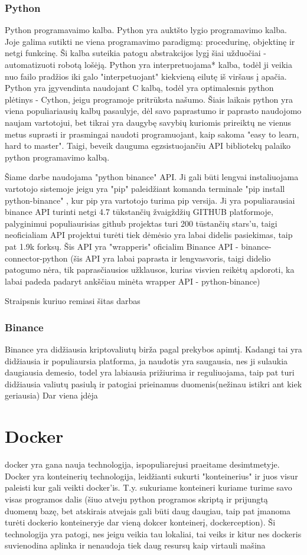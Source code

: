 \documentclass{VUMIFInfKursinis}
\begin{document}
\subsubsection{Python}
Python programavaimo kalba. Python yra auktšto lygio programavimo kalba. Joje galima sutikti ne viena programavimo paradigmą:
procedurinę, objektinę ir netgi funkcinę. Ši kalba suteikia patogu abstrakcijos lygį šiai užduočiai - automatizuoti robotą lošėją.
Python yra interpretuojama* kalba, todėl ji veikia nuo failo pradžios iki galo "interpetuojant" kiekvieną eilutę iš viršaus į apačia.
Python yra įgyvendinta naudojant C kalbą, todėl yra optimalesnis python plėtinys - Cython, jeigu programoje pritrūksta našumo. Šiais laikais
python yra viena populiariausių kalbų pasaulyje, dėl savo paprastumo ir paprasto naudojomo naujam vartotojui, bet tikrai yra daugybę savybių
kuriomis prireiktų ne vienus metus suprasti ir prasmingai naudoti programuojant, kaip sakoma "easy to learn, hard to master". Taigi, beveik dauguma
egzsistuojančiu API bibliotekų palaiko python programavimo kalbą.

Šiame darbe naudojama "python binance" API. Ji gali būti lengvai instaliuojama vartotojo sistemoje jeigu yra "pip" paleidžiant komanda terminale "pip install python-binance"
, kur pip yra vartotojo turima pip versija. Ji yra populiarausiai binance API turinti netgi 4.7 tūkstančių žvaigždžių GITHUB platformoje\cite{DokTest}, palyginimui populiaurisias github projektas turi
200 tūstančių stars'u, taigi neoficialiam API projektui turėti tiek dėmėsio yra labai didelis pasiekimas, taip pat 1.9k forksų. Šis API yra "wrapperis" oficialim
Binance API - binance-connector-python (šis API yra labai paprasta ir lengvasvoris, taigi didelio patogumo nėra, tik paprasčiausios užklausos, kurias visvien
reikėtų apdoroti, ka labai padeda padaryt ankščiau minėta wrapper API - python-binance)  

Straipsnis kuriuo remiasi šitas darbas
\subsubsection{Binance}
Binance yra didžiausia kriptovaliutų birža pagal prekybos apimtį. Kadangi tai yra didžiausia ir populiaursia platforma, ja naudotis yra saugausia, nes ji 
sulaukia daugiausia demesio, todel yra labiausia prižiurima ir reguliuojama, taip pat turi didžiausia valiutų pasiulą ir patogiai prieinamus duomenis(nežinau istikri
ant kiek geriausia)
Dar viena įdėja
\section{Docker}
docker yra gana nauja technologija, ispopuliarejusi praeitame desimtmetyje. Docker yra konteinerių technologija, leidžianti sukurti "konteinerius" ir juos visur paleisti kur gali veikti docker'is. T.y. sukuriame konteineri kuriame turime savo visas programos dalis (šiuo atveju python programos skriptą ir prijungtą duomenų bazę, bet atskirais atvejais gali būti daug daugiau, taip pat įmanoma turėti dockerio konteineryje dar vieną dokcer konteinerį, dockerception). Ši technologija yra patogi, nes jeigu veikia tau lokaliai, tai veiks ir kitur
nes dockeris suvienodina aplinka ir nenaudoja tiek daug resursų kaip 
virtauli mašina
\end{document}
